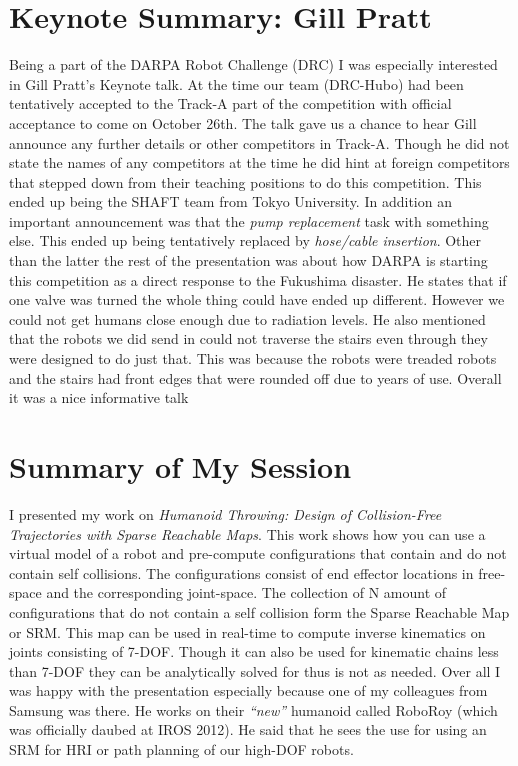 \documentclass[11pt,a4paper,oneside]{report}
\begin{document}
\section*{Keynote Summary: Gill Pratt}
Being a part of the DARPA Robot Challenge (DRC) I was especially interested in Gill Pratt's Keynote talk.  
At the time our team (DRC-Hubo) had been tentatively accepted to the Track-A part of the competition with official acceptance to come on October 26th.  
The talk gave us a chance to hear Gill announce any further details or other competitors in Track-A.  
Though he did not state the names of any competitors at the time he did hint at foreign competitors that stepped down from their teaching positions to do this competition.  
This ended up being the SHAFT team from Tokyo University.  
In addition an important announcement was that the \textit{pump replacement} task with something else.  
This ended up being tentatively replaced by \textit{hose/cable insertion}.  
Other than the latter the rest of the presentation was about how DARPA is starting this competition as a direct response to the Fukushima disaster. 
He states that if one valve was turned the whole thing could have ended up different.
However we could not get humans close enough due to radiation levels.
He also mentioned that the robots we did send in could not traverse the stairs even through they were designed to do just that. 
This was because the robots were treaded robots and the stairs had front edges that were rounded off due to years of use.
Overall it was a nice informative talk

\section*{Summary of My Session}
I presented my work on \textit{Humanoid Throwing: Design of Collision-Free Trajectories with Sparse Reachable Maps}.  
This work shows how you can use a virtual model of a robot and pre-compute configurations that contain and do not contain self collisions.  
The configurations consist of end effector locations in free-space and the corresponding joint-space.  
The collection of N amount of configurations that do not contain a self collision form the Sparse Reachable Map or SRM.  
This map can be used in real-time to compute inverse kinematics on joints consisting of  7-DOF.  
Though it can also be used for kinematic chains less than 7-DOF they can be analytically solved for thus is not as needed.
Over all I was happy with the presentation especially because one of my colleagues from Samsung was there.
He works on their \textit{``new''} humanoid called RoboRoy (which was officially daubed at IROS 2012).
He said that he sees the use for using an SRM for HRI or path planning of our high-DOF robots.
\end{document}
